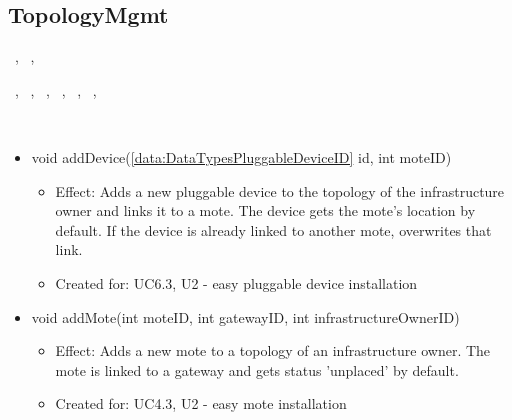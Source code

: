   \subsection{TopologyMgmt}\label{int:OnlineServiceOnlineServiceTopologyManagerTopologyMgmt}
    \begin{description}
      \item[Provided by:] \iconcomponent{}~, \iconcomponent{}~, \iconcomponent{}~
      \item[Required by:] \iconcomponent{}~, \iconcomponent{}~, \iconcomponent{}~, \iconcomponent{}~, \iconcomponent{}~, \iconcomponent{}~, \iconcomponent{}~
      \item[Operations:] ~
    \begin{itemize}[noitemsep,nolistsep,leftmargin=-.25cm]
      \item \textsf{void addDevice(\ref{data:DataTypesPluggableDeviceID} id, int moteID)}
        \begin{itemize}[noitemsep,nolistsep]
           \item Effect: Adds a new pluggable device to the topology of the infrastructure owner and links it to a mote. The device gets the mote's location by default. If the device is already linked to another mote, overwrites that link.
\item Created for: UC6.3, U2 - easy pluggable device installation
        \end{itemize}
      \item \textsf{void addMote(int moteID, int gatewayID, int infrastructureOwnerID)}
        \begin{itemize}[noitemsep,nolistsep]
           \item Effect: Adds a new mote to a topology of an infrastructure owner. The mote is linked to a gateway and gets status 'unplaced' by default.
\item Created for: UC4.3, U2 - easy mote installation

\end{itemize}
\end{itemize}
\end{description}
